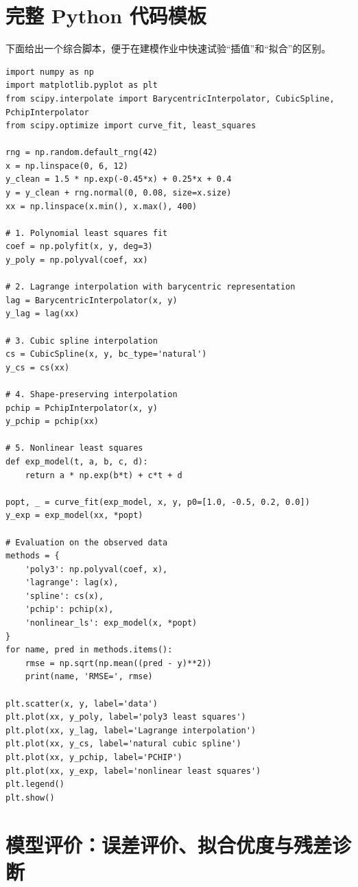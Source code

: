 \documentclass[11pt,a4paper]{ctexart}
\begin{document}
\newpage
\section{完整 Python 代码模板}

下面给出一个综合脚本，便于在建模作业中快速试验“插值”和“拟合”的区别。

\begin{lstlisting}
import numpy as np
import matplotlib.pyplot as plt
from scipy.interpolate import BarycentricInterpolator, CubicSpline, PchipInterpolator
from scipy.optimize import curve_fit, least_squares

rng = np.random.default_rng(42)
x = np.linspace(0, 6, 12)
y_clean = 1.5 * np.exp(-0.45*x) + 0.25*x + 0.4
y = y_clean + rng.normal(0, 0.08, size=x.size)
xx = np.linspace(x.min(), x.max(), 400)

# 1. Polynomial least squares fit
coef = np.polyfit(x, y, deg=3)
y_poly = np.polyval(coef, xx)

# 2. Lagrange interpolation with barycentric representation
lag = BarycentricInterpolator(x, y)
y_lag = lag(xx)

# 3. Cubic spline interpolation
cs = CubicSpline(x, y, bc_type='natural')
y_cs = cs(xx)

# 4. Shape-preserving interpolation
pchip = PchipInterpolator(x, y)
y_pchip = pchip(xx)

# 5. Nonlinear least squares
def exp_model(t, a, b, c, d):
    return a * np.exp(b*t) + c*t + d

popt, _ = curve_fit(exp_model, x, y, p0=[1.0, -0.5, 0.2, 0.0])
y_exp = exp_model(xx, *popt)

# Evaluation on the observed data
methods = {
    'poly3': np.polyval(coef, x),
    'lagrange': lag(x),
    'spline': cs(x),
    'pchip': pchip(x),
    'nonlinear_ls': exp_model(x, *popt)
}
for name, pred in methods.items():
    rmse = np.sqrt(np.mean((pred - y)**2))
    print(name, 'RMSE=', rmse)

plt.scatter(x, y, label='data')
plt.plot(xx, y_poly, label='poly3 least squares')
plt.plot(xx, y_lag, label='Lagrange interpolation')
plt.plot(xx, y_cs, label='natural cubic spline')
plt.plot(xx, y_pchip, label='PCHIP')
plt.plot(xx, y_exp, label='nonlinear least squares')
plt.legend()
plt.show()
\end{lstlisting}


\newpage
\section{模型评价：误差评价、拟合优度与残差诊断}
\end{document}
